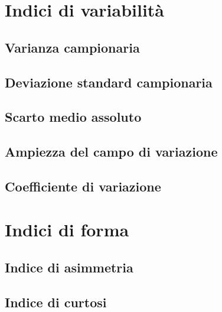 \documentclass[14pt, openany, titlepage]{report} %
\begin{document}
\chapter{Indici di variabilità} 

\section{Varianza campionaria}
    
\section{Deviazione standard campionaria}
    
\section{Scarto medio assoluto}

\section{Ampiezza del campo di variazione}

\section{Coefficiente di variazione}

\chapter{Indici di forma}
 
\section{Indice di asimmetria}

\section{Indice di curtosi} 
\end{document}
